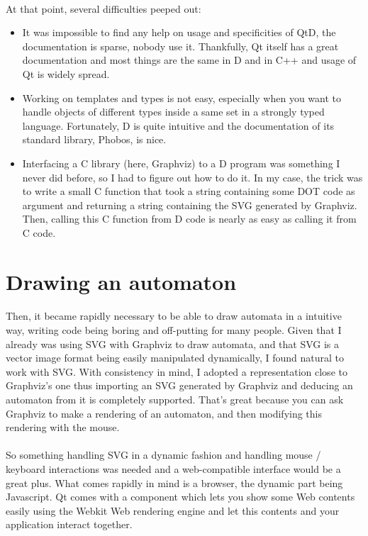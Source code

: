 \documentclass{article}
\begin{document}
\begin{sloppypar}
   
\paragraph{}
At that point, several difficulties peeped out:
    
\begin{itemize}
	\item{ It was impossible to find any help on usage and specificities of QtD, the documentation is sparse, nobody use it. Thankfully, Qt itself has a great documentation and most things are the same in D and in C++ and usage of Qt is widely spread.}
	\item{ Working on templates and types is not easy, especially when you want to handle objects of different types inside a same set in a strongly typed language. Fortunately, D is quite intuitive and the documentation of its standard library, Phobos, is nice.}
	\item{ Interfacing a C library (here, Graphviz) to a D program was something I never did before, so I had to figure out how to do it. In my case, the trick was to write a small C function that took a string containing some DOT code as argument and returning a string containing the SVG generated by Graphviz. Then, calling this C function from D code is nearly as easy as calling it from C code.}
\end{itemize}




\section{ Drawing an automaton}


\paragraph{}
Then, it became rapidly necessary to be able to draw automata in a intuitive way, writing code being boring and off-putting for many people.
   Given that I already was using SVG with Graphviz to draw automata, and that SVG is a vector image format being easily manipulated dynamically, I found natural to work with SVG. With consistency in mind, I adopted a representation close to Graphviz's one thus importing an SVG generated by Graphviz and deducing an automaton from it is completely supported. That's great because you can ask Graphviz to make a rendering of an automaton, and then modifying this rendering with the mouse.

   
\paragraph{}
So something handling SVG in a dynamic fashion and handling mouse / keyboard interactions was needed and a web-compatible interface would be a great plus. What comes rapidly in mind is a browser, the dynamic part being Javascript. Qt comes with a component which lets you show some Web contents easily using the Webkit Web rendering engine and let this contents and your application interact together.
   

\end{sloppypar}
\end{document}
